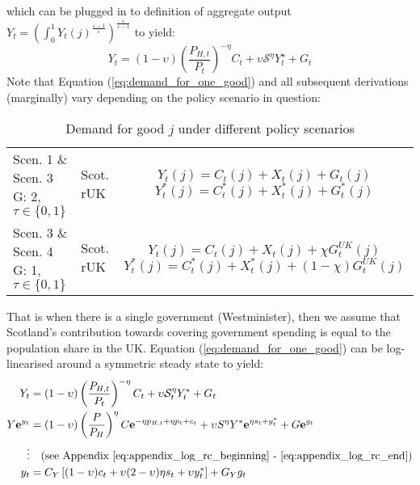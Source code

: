which can be plugged in to definition of aggregate output $Y_t = \left( \int_{0}^{1} Y_t(j)^{\frac{\varepsilon-1}{\varepsilon}}\right)^{\frac{\varepsilon}{\varepsilon-1}}$ to yield:
\begin{equation}
 Y_t = (1-\upsilon) \left(\frac{P_{H,t}}{P_t}\right)^{-\eta}C_t + \upsilon \mathcal{S}^\eta Y^\star_t + G_t
\end{equation}
Note that Equation (\ref{eq:demand_for_one_good}) and all subsequent derivations (marginally) vary depending on the policy scenario in question:
\begin{table}[H]
 \renewcommand{\arraystretch}{2}
 \centering
 \begin{tabular}{l|l|c}
 \makecell{Scen. 1 \& Scen. 3\\ G: 2, $\tau \in \{0, 1\}$} & \makecell{Scot. \\ rUK } & 
 \makecell{
 $Y_t(j) = C_t(j) + X_t(j) + G_t(j)$\\
 $Y^*_t(j) = C^*_t(j) + X^*_t(j) + G^*_t(j)$
 } \\ 
 \makecell{Scen. 3 \& Scen. 4\\ G: 1, $\tau \in \{0, 1\}$} & \makecell{Scot. \\ rUK } & 
 \makecell{
 $Y_t(j) = C_t(j) + X_t(j) + \chi G^{UK}_t(j)$\\
 $Y^*_t(j) = C^*_t(j) + X^*_t(j) + (1-\chi) G^{UK}_t(j)$
 } 
 \end{tabular}
 \vspace{0.5cm}
 \caption{Demand for good $j$ under different policy scenarios}
\end{table}
That is when there is a single government (Westminister), then we assume that Scotland's contribution towards covering government spending is equal to the population share in the UK. Equation (\ref{eq:demand_for_one_good}) can be log-linearised around a symmetric steady state to yield:
\begin{align}
 Y_t &= (1-\upsilon)\left(\frac{P_{H,t}}{P_t}\right)^{-\eta}C_t + \upsilon \mathcal{S}_t^{\eta}Y_t^* + G_t\\
 Y \mathbf{e}^{y_t} &= (1-\upsilon)\left(\frac{P}{P_{H}}\right)^{\eta}C \mathbf{e}^{-\eta p_{H,t} + \eta p_t + c_t}+ \upsilon S^{\eta} Y^* \mathbf{e}^{\eta s_t + y^*_t} + G \mathbf{e}^{g_t}\\
 \vdots & \quad \text{(see Appendix \ref{eq:appendix_log_rc_beginning} - \ref{eq:appendix_log_rc_end})} \nonumber \\
 y_t &= C_Y\left[(1-\upsilon)c_t + \upsilon (2-\upsilon)\eta s_t + \upsilon y^*_t\right] + G_Y g_t \label{eq:aggregate_rc}
\end{align}
